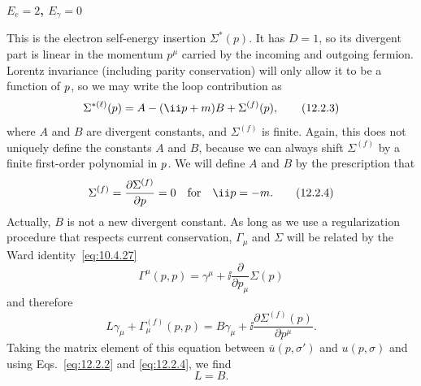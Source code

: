 \par\noindent\textbf{$E_e=2$, $E_\gamma=0$}\par
This is the electron self-energy insertion $\Sigma^*(p)$. It has $D=1$, so
its divergent part is linear in the momentum $p^\mu$ carried by the incoming
and outgoing fermion. Lorentz invariance (including parity conservation)
will only allow it to be a function of $\sl{p}$, so we may write the loop
contribution as
\begin{equation}
  \Sigma^{*(\ell)}(p)=A-(\ii\sl{p}+m)B+\Sigma^{(f)}(\sl{p}),
  \tag{12.2.3}\label{eq:12.2.3}
\end{equation}
where $A$ and $B$ are divergent constants, and $\Sigma^{(f)}$ is finite.
Again, this does not uniquely define the constants $A$ and $B$, because we
can always shift $\Sigma^{(f)}$ by a finite first-order polynomial in
$\sl{p}$. We will define $A$ and $B$ by the prescription that
\begin{equation}
  \Sigma^{(f)}=\frac{\partial\Sigma^{(f)}}{\partial\sl{p}}=0
  \quad\text{for}\quad \ii\sl{p}=-m.
  \tag{12.2.4}\label{eq:12.2.4}
\end{equation}
Actually, $B$ is not a new divergent constant. As long as we use a
regularization procedure that respects current conservation, $\Gamma_\mu$
and $\Sigma$ will be related by the Ward identity~\eqref{eq:10.4.27}
\[
  \Gamma^\mu(p,p)=\gamma^\mu+\ii\frac{\partial}{\partial p_\mu}\Sigma(p)
\]
and therefore
\begin{equation}
  L\gamma_\mu+\Gamma_\mu^{(f)}(p,p)
  =B\gamma_\mu+\ii\frac{\partial\Sigma^{(f)}(p)}{\partial p^\mu}.
  \tag{12.2.5}\label{eq:12.2.5}
\end{equation}
Taking the matrix element of this equation between $\bar u(p,\sigma')$ and
$u(p,\sigma)$ and using Eqs.~\eqref{eq:12.2.2} and \eqref{eq:12.2.4}, we find
\begin{equation}
  L=B.
  \tag{12.2.6}\label{eq:12.2.6}
\end{equation}

